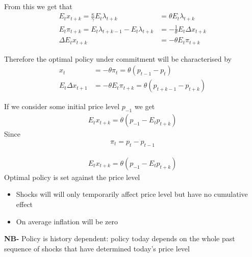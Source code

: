 \documentclass{beamer}
\begin{document}
\begin{frame}
  From this we get that 
\begin{align}
  E_t x_{t+k}= \frac{\kappa}{\gamma} E_t\lambda_{t+k} &= \theta E_t \lambda_{t+k}\\
  E_t \pi_{t+k} = E_t \lambda_{t+k-1} - E_t \lambda_{t+k} &= -\frac{1}{\theta}E_t \Delta x_{t+k}\\
  \Delta E_t x_{t+k} &= - \theta E_t \pi_{t+k}
\end{align}

Therefore the optimal policy under commitment will be characterised by
\begin{align}
  x_t &= -\theta\pi_t = \theta(p_{t-1}-p_t)\\
  E_t \Delta x_{t+1} &= -\theta E_t \pi_{t+k} = \theta (p_{t+k-1} - p_{t+k})
\end{align}  
\end{frame}

\begin{frame}
  If we consider some initial price level $p_{-1}$ we get
\begin{align}  
  E_t x_{t+k} = \theta(p_{-1} - E_tp_{t+k}) 
\end{align}
Since
\begin{align}
  \pi_t=p_t-p_{t-1}
\end{align}
\end{frame}

\begin{frame}
  \begin{align}  
  E_t x_{t+k} = \theta(p_{-1} - E_tp_{t+k}) 
\end{align}
Optimal policy is set against the price level
\begin{itemize}
  \item Shocks will will only temporarily affect price level but have no cumulative effect
  \item On average inflation will be zero 
\end{itemize}
\medskip
\textbf{NB-} Policy is history dependent: policy today depends on the whole past sequence of shocks that have determined today's price level
\end{frame}
\end{document}
